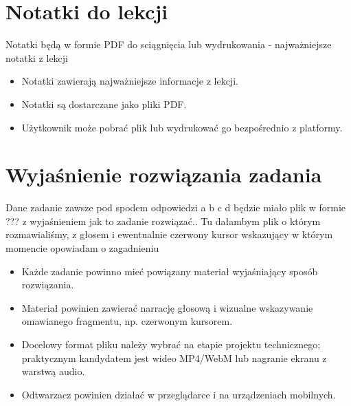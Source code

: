 \documentclass[12pt,a4paper]{report}
\begin{document}
\section{Notatki do lekcji}
\begin{ElearnReviewComment}[title={Komentarz nr 7 -- Anna Kogut, 2026-07-22}]
Notatki będą w formie PDF do sciągnięcia lub wydrukowania - najważniejsze notatki z lekcji
\end{ElearnReviewComment}
\begin{ElearnRequirement}[title={Wymagania wynikające z komentarza}]
\begin{itemize}
  \item Notatki zawierają najważniejsze informacje z lekcji.
  \item Notatki są dostarczane jako pliki PDF.
  \item Użytkownik może pobrać plik lub wydrukować go bezpośrednio z platformy.
\end{itemize}
\end{ElearnRequirement}
\section{Wyjaśnienie rozwiązania zadania}
\begin{ElearnReviewComment}[title={Komentarz nr 8 -- Anna Kogut, 2026-07-22}]
Dane zadanie zawsze pod spodem odpowiedzi a b c d będzie miało plik w formie ??? z wyjaśnieniem jak to zadanie rozwiązać.. Tu dałambym plik o którym rozmawialiśmy, z głosem i ewentualnie czerwony kursor wskazujący w którym momencie opowiadam o zagadnieniu
\end{ElearnReviewComment}
\begin{ElearnRequirement}[title={Wymagania wynikające z komentarza}]
\begin{itemize}
  \item Każde zadanie powinno mieć powiązany materiał wyjaśniający sposób rozwiązania.
  \item Materiał powinien zawierać narrację głosową i wizualne wskazywanie omawianego fragmentu, np. czerwonym kursorem.
  \item Docelowy format pliku należy wybrać na etapie projektu technicznego; praktycznym kandydatem jest wideo MP4/WebM lub nagranie ekranu z warstwą audio.
  \item Odtwarzacz powinien działać w przeglądarce i na urządzeniach mobilnych.
\end{itemize}
\end{ElearnRequirement}
\clearpage
\end{document}
